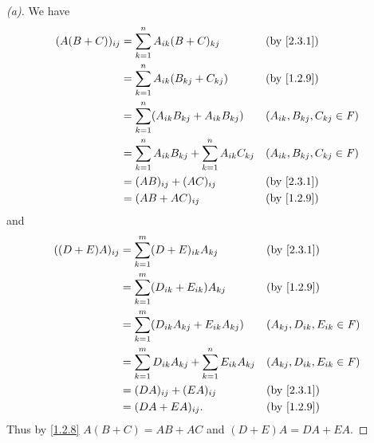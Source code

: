 \begin{proof}[(a)]
  We have
  \begin{align*}
    (A (B + C))_{i j} & = \sum_{k = 1}^n A_{i k} (B + C)_{k j}                            &  & \text{(by \cref{2.3.1})}           \\
                      & = \sum_{k = 1}^n A_{i k} (B_{k j} + C_{k j})                      &  & \text{(by \cref{1.2.9})}           \\
                      & = \sum_{k = 1}^n (A_{i k} B_{k j} + A_{i k} B_{k j})              &  & (A_{i k}, B_{k j}, C_{k j} \in \F) \\
                      & = \sum_{k = 1}^n A_{i k} B_{k j} + \sum_{k = 1}^n A_{i k} C_{k j} &  & (A_{i k}, B_{k j}, C_{k j} \in \F) \\
                      & = (AB)_{i j} + (AC)_{i j}                                         &  & \text{(by \cref{2.3.1})}           \\
                      & = (AB + AC)_{i j}                                                 &  & \text{(by \cref{1.2.9})}
  \end{align*}
  and
  \begin{align*}
    ((D + E) A)_{i j} & = \sum_{k = 1}^m (D + E)_{i k} A_{k j}                            &  & \text{(by \cref{2.3.1})}           \\
                      & = \sum_{k = 1}^m (D_{i k} + E_{i k}) A_{k j}                      &  & \text{(by \cref{1.2.9})}           \\
                      & = \sum_{k = 1}^m (D_{i k} A_{k j} + E_{i k} A_{k j})              &  & (A_{k j}, D_{i k}, E_{i k} \in \F) \\
                      & = \sum_{k = 1}^m D_{i k} A_{k j} + \sum_{k = 1}^n E_{i k} A_{k j} &  & (A_{k j}, D_{i k}, E_{i k} \in \F) \\
                      & = (DA)_{i j} + (EA)_{i j}                                         &  & \text{(by \cref{2.3.1})}           \\
                      & = (DA + EA)_{i j}.                                                &  & \text{(by \cref{1.2.9})}
  \end{align*}
  Thus by \cref{1.2.8} \(A (B + C) = AB + AC\) and \((D + E) A = DA + EA\).
\end{proof}

